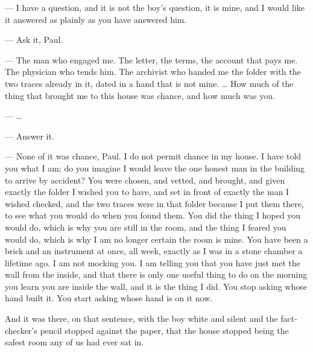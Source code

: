 \begin{room}

--- I have a question, and it is not the boy's question, it is mine, and I would like it answered as plainly as you have answered him.

--- Ask it, Paul.

--- The man who engaged me. The letter, the terms, the account that pays me. The physician who tends him. The archivist who handed me the folder with the two traces already in it, dated in a hand that is not mine. \ldots{} How much of the thing that brought me to this house was chance, and how much was you.

--- \ldots{}

--- Answer it.

--- None of it was chance, Paul. I do not permit chance in my house. I have told you what I am; do you imagine I would leave the one honest man in the building to arrive by accident? You were chosen, and vetted, and brought, and given exactly the folder I wished you to have, and set in front of exactly the man I wished checked, and the two traces were in that folder because I put them there, to see what you would do when you found them. You did the thing I hoped you would do, which is why you are still in the room, and the thing I feared you would do, which is why I am no longer certain the room is mine. You have been a brick and an instrument at once, all week, exactly as I was in a stone chamber a lifetime ago. I am not mocking you. I am telling you that you have just met the wall from the inside, and that there is only one useful thing to do on the morning you learn you are inside the wall, and it is the thing I did. You stop asking whose hand built it. You start asking whose hand is on it now.

\end{room}

And it was there, on that sentence, with the boy white and silent and the fact-checker's pencil stopped against the paper, that the house stopped being the safest room any of us had ever sat in.\par

